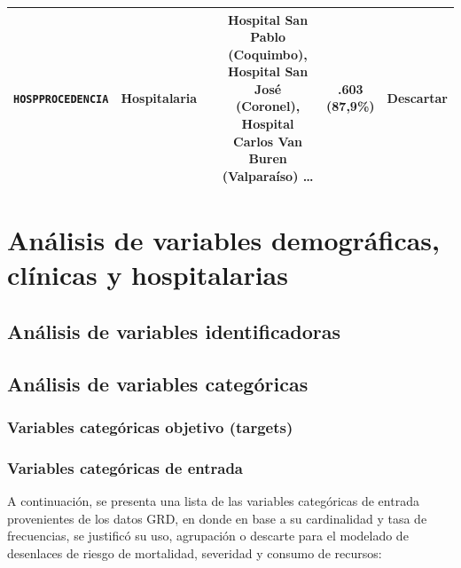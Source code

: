 \begin{table}[htbp]
\begin{tabular}{|c|c|c|c|c|c|}
\parbox[t]{2.6cm}{\raggedright \texttt{HOSPPROCEDENCIA}} &
\parbox[t]{1.5cm}{\centering Hospitalaria} &
\parbox[t]{1cm}{} &
\parbox[t]{4.4cm}{\raggedright Hospital San Pablo (Coquimbo), Hospital San José (Coronel), Hospital Carlos Van Buren (Valparaíso) \ldots} &
\parbox[t]{1.4cm}{.603\\(87,9\%)} &
\parbox[t]{3cm}{\raggedright Descartar} \\ \hline

\end{tabular}
\end{table}




\section{Análisis de variables demográficas, clínicas y hospitalarias}

\subsection{Análisis de variables identificadoras}


\subsection{Análisis de variables categóricas}


\subsubsection{Variables categóricas objetivo (targets)}


\subsubsection{Variables categóricas de entrada}

A continuación, se presenta una lista de las variables categóricas de entrada provenientes de los datos GRD, en donde en base a su cardinalidad y tasa de frecuencias, se justificó su uso, agrupación o descarte para el modelado de desenlaces de riesgo de mortalidad, severidad y consumo de recursos:

